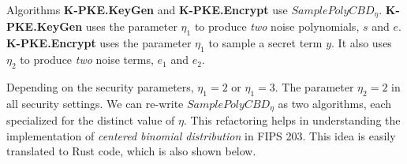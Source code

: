 \documentclass[12pt]{article}
\begin{document}
Algorithms \textbf{K-PKE.KeyGen} and \textbf{K-PKE.Encrypt} use $SamplePolyCBD_\eta$. \textbf{K-PKE.KeyGen} uses the parameter $\eta_1$ to produce \textit{two} noise polynomials, $s$ and $e$. \textbf{K-PKE.Encrypt} uses the parameter $\eta_1$ to sample a secret term $y$. It also uses $\eta_2$ to produce \textit{two} noise terms, $e_1$ and $e_2$.

Depending on the security parameters, $\eta_1 = 2$ or $\eta_1 = 3$. The parameter $\eta_2 = 2$ in all security settings. We can re-write $SamplePolyCBD_\eta$ as two algorithms, each specialized for the distinct value of $\eta$. This refactoring helps in understanding the implementation of \textit{centered binomial distribution} in FIPS 203. This idea is easily translated to Rust code, which is also shown below.

\begin{algorithm}[H]
\caption*{\textbf{Annotated Algorithm 8-A} $\Name{SamplePolyCBD}_2(B:\mathbb{B}^{128}) \rightarrow (f:\RingZq$)}
\begin{algorithmic}[1]
\vspace*{1pt}


     {}
     {}
    \vspace*{1pt}
        \vspace*{1pt}
        \vspace*{1pt}
\EndFor

    {}

\end{algorithmic}
\end{algorithm}
\end{document}

